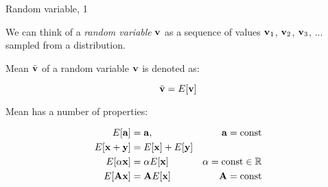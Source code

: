 \documentclass{beamer}
\begin{document}
\begin{frame}{Random variable, 1}
\begin{flushleft}

We can think of a \emph{random variable} $\mathbf{v}$ as a sequence of values $\mathbf{v}_1$, $\mathbf{v}_2$, $\mathbf{v}_3$, ... sampled from a distribution.

\bigskip

Mean $\bar{\mathbf{v}}$ of a random variable $\mathbf{v}$ is denoted as:

\begin{equation}
	\bar{\mathbf{v}} = E[\mathbf{v}]
\end{equation}

Mean has a number of properties:

\begin{align}
	E[\mathbf{a}] &= \mathbf{a}, & \mathbf{a}= \text{const} \\
	E[\mathbf{x}+\mathbf{y}] &= E[\mathbf{x}] + E[\mathbf{y}] &\\
	E[\alpha \mathbf{x}] &= \alpha  E[\mathbf{x}]  & \alpha = \text{const} \in \mathbb{R} \\
	E[\mathbf{A} \mathbf{x}] &= \mathbf{A}  E[\mathbf{x}] & \mathbf{A} = \text{const}
\end{align}


\end{flushleft}
\end{frame}
\end{document}
